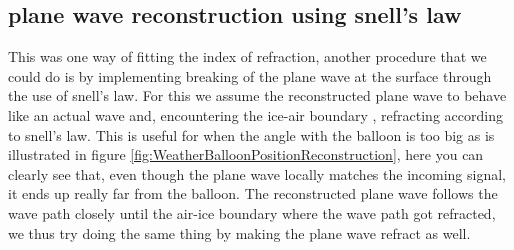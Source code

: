 \subsection{plane wave reconstruction using snell's law}
This was one way of fitting the index of refraction, another procedure
that we could do is by implementing breaking of the plane wave at 
the surface through the use of snell's law. 
For this we assume the reconstructed plane wave to behave like an actual wave and, encountering the ice-air boundary
, refracting according to snell's law. This is useful for when the angle with the
balloon is too big as is illustrated in figure \ref{fig:WeatherBalloonPositionReconstruction},
here you can clearly see that, even though the plane wave locally matches the incoming
signal, it ends up really far from the balloon. The reconstructed plane wave follows
the wave path closely until the air-ice boundary where the wave path got refracted,
we thus try doing the same thing by making the plane wave refract as well.


